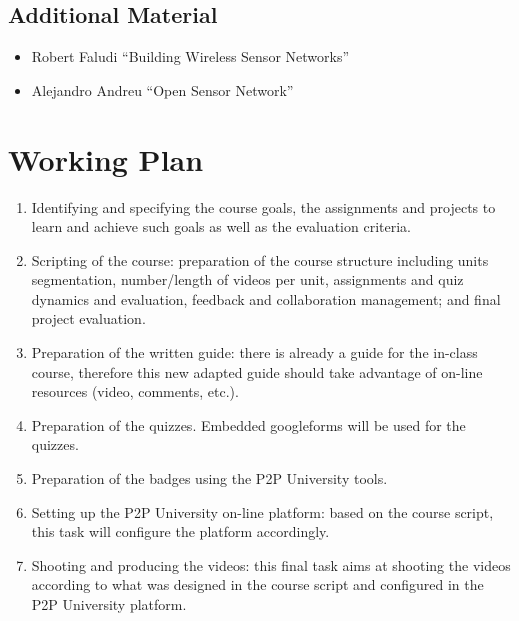 \documentclass[oneside]{book}   %
\begin{document}
\section{Additional Material}

\begin{itemize}
\item Robert Faludi ``Building Wireless Sensor Networks''
\item Alejandro Andreu ``Open Sensor Network''
\end{itemize}



\chapter{Working Plan}

\begin{enumerate}
    \item Identifying and specifying the course goals, the assignments and projects to learn and achieve such goals as well as the evaluation criteria.
	\item Scripting of the course: preparation of the course structure including units segmentation, number/length of videos per unit, assignments and quiz dynamics and evaluation, feedback and collaboration management; and final project evaluation.
	\item Preparation of the written guide: there is already a guide for the in-class course, therefore this new adapted guide should take advantage of on-line resources (video, comments, etc.).
    \item Preparation of the quizzes. 
    Embedded googleforms will be used for the quizzes.
    \item Preparation of the badges using the P2P University tools.
	\item Setting up the P2P University on-line platform: based on the course script, this task will configure the platform accordingly.
	\item Shooting and producing the videos: this final task aims at shooting the videos according to what was designed in the course script and configured in the P2P University platform.
\end{enumerate}


\end{document}
